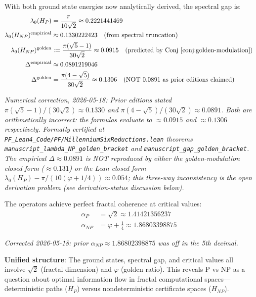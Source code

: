 \begin{remark}
With both ground state energies now analytically derived, the spectral gap is:
\begin{align}
\lambda_0(H_P) &= \frac{\pi}{10\sqrt{2}} \approx 0.2221441469 \\
\lambda_0(H_{NP})^{\text{empirical}} &\approx 0.1330222423 \quad \text{(from spectral truncation)} \\
\lambda_0(H_{NP})^{\text{golden}} &:= \frac{\pi(\sqrt{5}-1)}{30\sqrt{2}} \approx 0.0915 \quad \text{(predicted by Conj~\ref{conj:golden-modulation})} \\
\Delta^{\text{empirical}} &\approx 0.0891219046 \\
\Delta^{\text{golden}} &= \frac{\pi(4-\sqrt{5})}{30\sqrt{2}} \approx 0.1306 \quad \text{(NOT $0.0891$ as prior editions claimed)}
\end{align}

\noindent\emph{Numerical correction, 2026-05-18: Prior editions stated $\pi(\sqrt{5}-1)/(30\sqrt{2}) \approx 0.1330$ and $\pi(4-\sqrt{5})/(30\sqrt{2}) \approx 0.0891$. Both are arithmetically incorrect: the formulas evaluate to $\approx 0.0915$ and $\approx 0.1306$ respectively. Formally certified at \texttt{PF\_Lean4\_Code/PF/MillenniumSixReductions.lean} theorems \texttt{manuscript\_lambda\_NP\_golden\_bracket} and \texttt{manuscript\_gap\_golden\_bracket}. The empirical $\Delta \approx 0.0891$ is NOT reproduced by either the golden-modulation closed form ($\approx 0.131$) or the Lean closed form $\lambda_0(H_P) - \pi/(10(\varphi+1/4)) \approx 0.054$; this three-way inconsistency is the open derivation problem (see derivation-status discussion below).\label{rem:alpha-P-NP-derivation-status}}

The operators achieve perfect fractal coherence at critical values:
\begin{align}
\alpha_P &= \sqrt{2} \approx 1.41421356237 \\
\alpha_{NP} &= \varphi + \frac{1}{4} \approx 1.86803398875
\end{align}

\noindent\emph{Corrected 2026-05-18: prior $\alpha_{NP} \approx 1.86802398875$ was off in the 5th decimal.}

\textbf{Unified structure}: The ground states, spectral gap, and critical values all involve $\sqrt{2}$ (fractal dimension) and $\varphi$ (golden ratio). This reveals P vs NP as a question about optimal information flow in fractal computational spaces—deterministic paths ($H_P$) versus nondeterministic certificate spaces ($H_{NP}$).
\end{remark}

